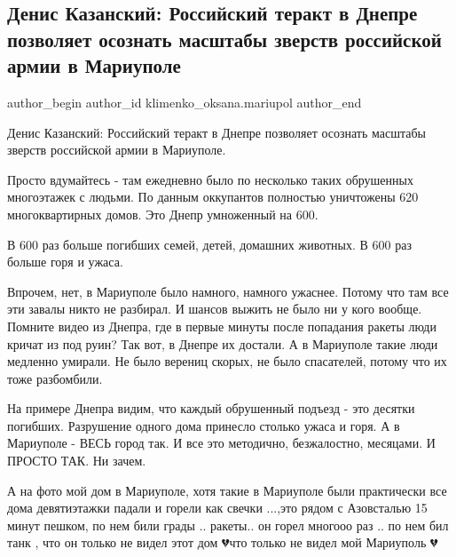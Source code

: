  
 
 
 
 

\subsection{Денис Казанский:  Российский теракт в Днепре позволяет осознать масштабы зверств российской армии в Мариуполе}
\label{sec:16_01_2023.fb.klimenko_oksana.mariupol.1.denis_kazanskii___ro}

\ifcmt
 author_begin
   author_id klimenko_oksana.mariupol
 author_end
\fi

Денис Казанский: 
Российский теракт в Днепре позволяет осознать масштабы зверств российской армии
в Мариуполе. 

Просто вдумайтесь - там ежедневно было по несколько таких обрушенных
многоэтажек с людьми. По данным оккупантов полностью уничтожены 620
многоквартирных домов. Это Днепр умноженный на 600. 

В 600 раз больше погибших семей, детей, домашних животных. В 600 раз больше
горя и ужаса. 

Впрочем, нет, в Мариуполе было намного, намного ужаснее. Потому что там все эти
завалы никто не разбирал. И шансов выжить не было ни у кого вообще. Помните
видео из Днепра, где в первые минуты после попадания ракеты люди кричат из под
руин? Так вот, в Днепре их достали. А в Мариуполе такие люди медленно умирали.
Не было верениц скорых, не было спасателей, потому что их тоже разбомбили. 

На примере Днепра видим, что каждый обрушенный подъезд - это десятки погибших.
Разрушение одного дома принесло столько ужаса и горя. А в Мариуполе - ВЕСЬ
город так. И все это методично, безжалостно, месяцами. И ПРОСТО ТАК. Ни зачем.

А на фото мой дом в Мариуполе, хотя такие в Мариуполе были практически все дома
девятиэтажки падали и горели как свечки ...,это  рядом с Азовсталью 15 минут
пешком, по нем били грады .. ракеты.. он горел многооо раз .. по нем бил танк
, что он только не видел этот дом 💔что только не видел мой Мариуполь 💔
